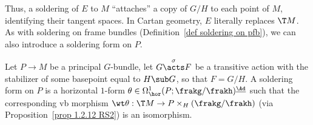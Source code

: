 Thus, a soldering of $E$ to $M$ ``attaches'' a copy of $G\slash H$ to each point of $M$, identifying their tangent spaces. In Cartan geometry, $E$ literally replaces $\T M$. As with soldering on frame bundles (Definition~\ref{def soldering on pfb}), we can also introduce a soldering form on $P$.


\begin{defn}
    Let $P\to M$ be a principal $G$-bundle, let $G\overset{\sigma}{\acts}F$ be a transitive action with the stabilizer of some basepoint equal to $H\sub G$, so that $F=G\slash H$. A soldering form on $P$ is a horizontal $1$-form $\theta\in\Omega^1_{\hor}(P;\frakg\slash\frakh)^{\underline{\Ad}}$ such that the corresponding \gls{vb} morphism $\wt\theta:\T M\to P\times_H(\frakg\slash\frakh)$ (via Proposition~\ref{prop 1.2.12 RS2}) is an isomorphism.
\end{defn}


